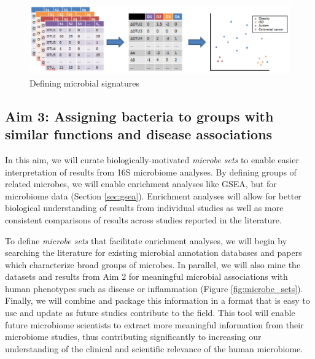 \documentclass[12pt]{article}
\begin{document}
\begin{figure}[H]
\begin{center}
\includegraphics[scale=0.5]{microbial_signatures}
\caption{Defining microbial signatures}\label{fig:microbe_signatures}
\end{center}
\end{figure}

\subsection{Aim 3: Assigning bacteria to groups with similar functions and disease associations}

In this aim, we will curate biologically-motivated \textit{microbe 
sets} to enable easier interpretation of results from 16S microbiome 
analyses. By defining groups of related microbes, we 
will enable enrichment analyses like GSEA, but for microbiome data (Section \ref{sec:gsea}). Enrichment analyses will allow for better 
biological understanding of results from individual studies as well as 
more consistent comparisons of results across studies reported in 
the literature.

To define \textit{microbe sets} that facilitate enrichment analyses, we will
begin by searching the literature for existing microbial annotation
databases and papers which characterize broad groups of microbes.
In parallel, we will also mine the datasets and results from Aim 2
for meaningful microbial associations with human phenotypes such as
disease or inflammation (Figure \ref{fig:microbe_sets}). Finally, we will combine and package this information
in a format that is easy to use and update as future studies contribute
to the field. This tool will enable future microbiome scientists to extract more
meaningful information from their microbiome studies, thus
contributing significantly to increasing our understanding of the
clinical and scientific relevance of the human microbiome.
\end{document}
